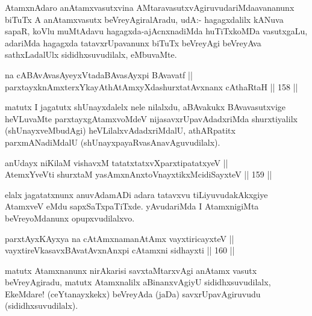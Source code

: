 \begin{artha}
AtamxnAdaro anAtamxvasutxvina AMtaravasutxvAgiruvudariMda\break avananunx
biTuTx A anAtamxvasutx beVreyAgiralAradu,  udA:- hagagxdalilx kANuva
sapaR, koVlu muMtAdavu hagagxda-ajAcnxnadiMda huTiTxkoMDa vasutxgaLu,
adariMda hagagxda tatavxrUpavanunx biTuTx beVreyAgi beVreyAva
sathxLadalUlx sididhxsuvudilalx, eMbuvaMte.
\end{artha}


\begin{shl}
na cABAvAvasAyeyxVtadaBAvasAyxpi BAvavatf || \\
parxtayxknAmxterxYkayAthAtAmxyXdashurxtatAvxnanx cAthaRtaH \hfill || 158 ||  
\end{shl}

\begin{artha}
matutx I jagatutx shUnayxdalelx nele nilalxdu, aBAvakukx
BAvavasutxvige heVLuvaMte parxtayxgAtamxvoMdeV nijasavxrUpavAdadxriMda
shurxtiyalilx (shUnayxveMbudAgi) heVLilalxvAdadxriMdalU, athARpatitx
parxmANadiMdalU (shUnayxpayaRvasAnavAguvudilalx).
\end{artha}

\begin{shl}
anUdayx niKilaM vishavxM tatatxtatxvXparxtipatatxyeV || \\
AtemxYveVti shurxtaM yasAmxnAnxtoV\s nayxtikxMcidiSayxteV \hfill || 159 ||  
\end{shl}

\begin{artha}
elalx jagatatxnunx anuvAdamADi adara tatavxvu tiLiyuvudakAkxgiye
AtamxveV eMdu sapxSaTxpaTiTxde. yAvudariMda I AtamxnigiMta
beVreyoMdanunx opupxvudilalxvo.
\end{artha}

\begin{shl}
parxtAyxKAyxya na cA\s \s tAmxnamanAtAmx vayxtiricayxteV || \\
vayxtireVkasavxBAvatAvxnAnxpi cA\s \s tamxni sidhayxti \hfill || 160 ||  
\end{shl}

\begin{artha}
matutx Atamxnanunx nirAkarisi savxtaMtarxvAgi anAtamx vasutx
beVreyAgiradu, matutx Atamxnalilx aBinanxvAgiyU sididhxsuvudilalx,
EkeMdare! (ceYtanayxkekx) beVreyAda (jaDa) savxrUpavAgiruvudu (sididhxsuvudilalx).
\end{artha}

